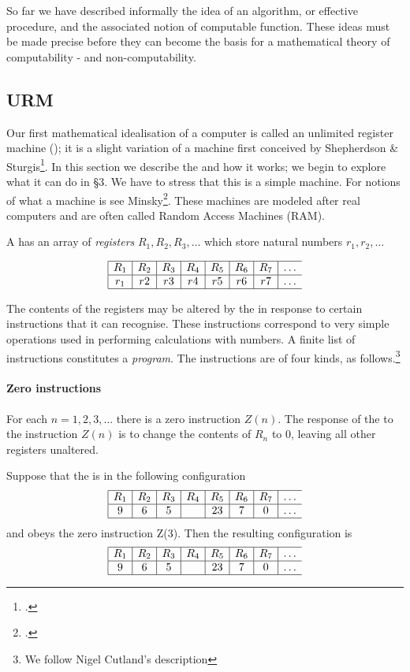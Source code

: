 So far we have described informally the idea of an algorithm, or 
effective procedure, and the associated notion of computable function. 
These ideas must be made precise before they can become the basis for a 
mathematical theory of computability - and non-computability. 

\subsection*{URM}

Our first mathematical idealisation of a computer is called an 
unlimited register machine (\URM); it is a slight variation of a machine 
first conceived by Shepherdson \& Sturgis\footcite{shepherdson1963}. In this section we 
describe the \URM and how it works; we begin to explore what it can do in 
§3. We have to stress that this is a simple machine. For notions of what a machine is see
Minsky\footcite{minsky1967}. These machines are modeled after real computers and are often called
Random Access Machines (RAM). 

A \URM has an array of \emph{registers} $R_1, R_2, R_3,\dots$ which store natural numbers $r_1,r_2,\dots$

\[
\begin{array}{|c|c|c|c|c|c|c|c}
\hline
R_1 & R_2 &R_3 &R_4 &R_5 &R_6 &R_7 &\dots\\
\hline
r_1 & r2  &r3  &r4  &r5  &r6  &r7  &\dots\\
\hline
\end{array}
\]

The contents of the registers may be altered by the \URM in response to 
certain instructions that it can recognise. These instructions correspond to 
very simple operations used in performing calculations with numbers. A 
finite list of instructions constitutes a \emph{program}. The instructions are of four 
kinds, as follows.\footnote{We follow Nigel Cutland's description} 


\paragraph{Zero instructions} For each $n = 1, 2, 3,\dots$ there is a zero instruction 
$Z(n)$. The response of the \URM to the instruction $Z(n)$ is to change the 
contents of $R_n$ to 0, leaving all other registers unaltered. 

Suppose that the \URM is in the following 
configuration 
\[
\begin{array}{|c|c|c|c|c|c|c|c}
\hline
R_1 & R_2 &R_3 &R_4 &R_5 &R_6 &R_7 &\dots\\
\hline
9 & 6  &5  &  &23  &7  &0  &\dots\\
\hline
\end{array}
\]
and obeys the zero instruction Z(3). Then the resulting configuration is
\[
\begin{array}{|c|c|c|c|c|c|c|c}
\hline
R_1 & R_2 &R_3 &R_4 &R_5 &R_6 &R_7 &\dots\\
\hline
9 & 6  &5  &  &23  &7  &0  &\dots\\
\hline
\end{array}
\]

